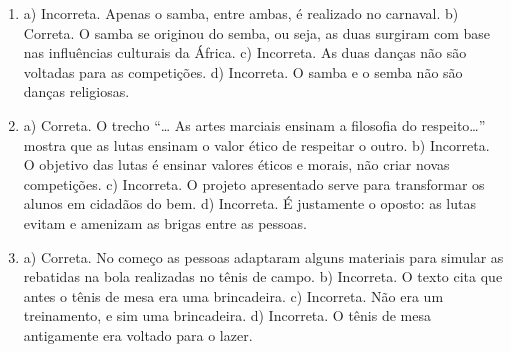 
\begin{enumerate}

\item
a) Incorreta. Apenas o samba, entre ambas, é realizado no carnaval.
b) Correta. O samba se originou do semba, ou seja, as duas
surgiram com base nas influências culturais da África.
c) Incorreta. As duas danças não são voltadas para as
competições.
d) Incorreta. O samba e o semba não são danças religiosas.

\item
a) Correta. O trecho “\ldots{} As artes marciais ensinam a filosofia
do respeito\ldots{}” mostra que as lutas ensinam o valor ético de respeitar
o outro.
b) Incorreta. O objetivo das lutas é ensinar valores éticos e
morais, não criar novas competições.
c) Incorreta. O projeto apresentado serve para transformar os alunos
em cidadãos do bem.
d) Incorreta. É justamente o oposto: as lutas
evitam e amenizam as brigas entre as pessoas.

\item
a) Correta. No começo as pessoas adaptaram alguns materiais para
simular as rebatidas na bola realizadas no tênis de campo.
b) Incorreta. O texto cita que antes o tênis de mesa era uma
brincadeira.
c) Incorreta. Não era um treinamento, e sim uma brincadeira.
d) Incorreta. O tênis de mesa antigamente era voltado para o
lazer.
\end{enumerate}
